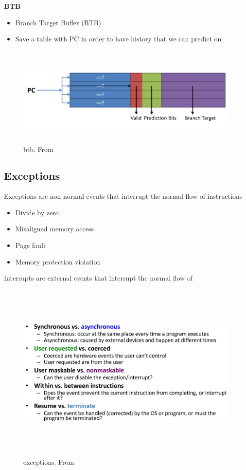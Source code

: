 \textbf{BTB}
\begin{itemize}
\item  Branch Target Buffer (BTB)
\item  Save a table with PC in order to have history that we can predict on
\end{itemize}

\begin{figure}[h]
    \vspace{10mm}
    \centering
    \includegraphics[width=16cm, height=5cm]{image/btb.png} 
    \caption{btb. From \cite{}}
\end{figure}


\subsection{Exceptions}
Exceptions are non-normal events that interrupt the normal flow of instructions
\begin{itemize}
\item  Divide by zero
\item  Misaligned memory access
\item  Page fault
\item  Memory protection violation
\end{itemize}

Interrupts are external events that interrupt the normal flow of 

\begin{figure}[h]
    \vspace{10mm}
    \centering
    \includegraphics[width=16cm, height=9cm]{image/exceptions.png} 
    \caption{exceptions. From \cite{}}
\end{figure}



